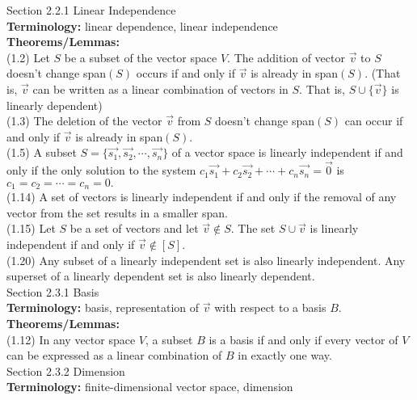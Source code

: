 \documentclass[11pt,fleqn]{article}
\begin{document}
\noindent Section 2.2.1 Linear Independence\\

\textbf{Terminology:} linear dependence, linear independence\\

\textbf{Theorems/Lemmas:}  \\
(1.2) Let $S$ be a subset of the vector space $V.$ The addition of vector $\vec{v}$ to $S$ doesn't change span$(S)$ occurs if and only if $\vec{v}$ is already in span$(S)$. (That is, $\vec{v}$ can be written as a linear combination of vectors in $S.$ That is, $S \cup \{\vec{v}\}$ is linearly dependent)\\
(1.3) The deletion of the vector $\vec{v}$ from $S$ doesn't change span$(S)$ can occur if and only if $\vec{v}$ is already in span$(S)$.\\
(1.5) A subset $S=\{\vec{s_1},\vec{s_2},\cdots,\vec{s_n}\}$ of a vector space is linearly  independent if and only if the only solution to the system $c_1\vec{s_1}+c_2\vec{s_2}+\cdots +c_n\vec{s_n}=\vec{0}$ is $c_1=c_2=\cdots=c_n=0.$\\
(1.14) A set of vectors is linearly independent if and only if the removal of any vector from the set results in a smaller span.\\
(1.15) Let $S$ be a set of vectors and let $\vec{v} \not \in S.$ The set $S \cup \vec{v}$ is linearly independent if and only if $\vec{v} \not \in [S].$\\
(1.20) Any subset of a linearly independent set is also linearly independent. Any superset of a linearly dependent set is also linearly dependent.\\

\noindent Section 2.3.1 Basis\\

\textbf{Terminology:} basis,  representation of $\vec{v}$ with respect to a basis $B.$\\

\textbf{Theorems/Lemmas:}\\
(1.12) In any vector space $V$, a subset $B$ is a basis if and only if every vector of $V$ can be expressed as a linear combination of $B$ in exactly one way.\\

\noindent Section 2.3.2 Dimension\\

\textbf{Terminology:} finite-dimensional vector space, dimension\\
\end{document}
